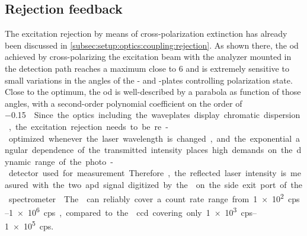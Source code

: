 \subsection{Rejection feedback}\label{subsec:sec:exp:mjolnir:calibration:rejection}
The excitation rejection by means of cross-polarization extinction has already been discussed in \cref{subsec:setup:optics:coupling:rejection}.
As shown there, the \gls{od} achieved by cross-polarizing the excitation beam with the analyzer mounted in the detection path reaches a maximum close to \num{6} and is extremely sensitive to small variations in the angles of the \quarterwave- and \halfwave-plates controlling polarization state.
Close to the optimum, the \gls{od} is well-described by a parabola as function of those angles, with a second-order polynomial coefficient on the order of \qty[per-mode = symbol]{-0.15}{\per\square\milli\txtdegree}.
Since the optics including the waveplates display chromatic dispersion, the excitation rejection needs to be re-optimized whenever the laser wavelength is changed, and the exponential angular dependence of the transmitted intensity places high demands on the dynamic range of the photo-detector used for measurement.
Therefore, the reflected laser intensity is measured with the two \gls{apd} signal digitized by the \tagger on the side exit port of the spectrometer.
The \taggershort can reliably cover a count rate range from \qtyrange{1e2}{1e6}{cps}, compared to the \theccd \gls{ccd} covering only \qtyrange{1e3}{1e5}{cps}.

